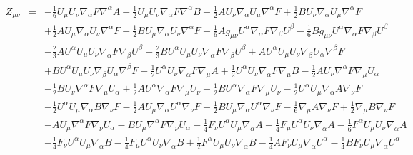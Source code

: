 \documentclass[10pt,letterpaper]{article}
\numberwithin{equation}{section}
\begin{document}
\begin{eqnarray}
Z_{\mu\nu}&=& - \tfrac{1}{6} U_{\mu } U_{\nu } \nabla_{\alpha }F \nabla^{\alpha }A + \tfrac{1}{2} U_{\mu } U_{\nu } \nabla_{\alpha }F \nabla^{\alpha }B + \tfrac{1}{2} A U_{\nu } \nabla_{\alpha }U_{\mu } \nabla^{\alpha }F + \tfrac{1}{2} B U_{\nu } \nabla_{\alpha }U_{\mu } \nabla^{\alpha }F \nonumber \\ 
&& + \tfrac{1}{2} A U_{\mu } \nabla_{\alpha }U_{\nu } \nabla^{\alpha }F + \tfrac{1}{2} B U_{\mu } \nabla_{\alpha }U_{\nu } \nabla^{\alpha }F -  \tfrac{1}{6} A g_{\mu \nu } U^{\alpha } \nabla_{\alpha }F \nabla_{\beta }U^{\beta } -  \tfrac{1}{6} B g_{\mu \nu } U^{\alpha } \nabla_{\alpha }F \nabla_{\beta }U^{\beta } \nonumber \\ 
&& -  \tfrac{2}{3} A U^{\alpha } U_{\mu } U_{\nu } \nabla_{\alpha }F \nabla_{\beta }U^{\beta } -  \tfrac{2}{3} B U^{\alpha } U_{\mu } U_{\nu } \nabla_{\alpha }F \nabla_{\beta }U^{\beta } + A U^{\alpha } U_{\mu } U_{\nu } \nabla_{\beta }U_{\alpha } \nabla^{\beta }F \nonumber \\ 
&& + B U^{\alpha } U_{\mu } U_{\nu } \nabla_{\beta }U_{\alpha } \nabla^{\beta }F + \tfrac{1}{2} U^{\alpha } U_{\nu } \nabla_{\alpha }F \nabla_{\mu }A + \tfrac{1}{2} U^{\alpha } U_{\nu } \nabla_{\alpha }F \nabla_{\mu }B -  \tfrac{1}{2} A U_{\nu } \nabla^{\alpha }F \nabla_{\mu }U_{\alpha } \nonumber \\ 
&& -  \tfrac{1}{2} B U_{\nu } \nabla^{\alpha }F \nabla_{\mu }U_{\alpha } + \tfrac{1}{2} A U^{\alpha } \nabla_{\alpha }F \nabla_{\mu }U_{\nu } + \tfrac{1}{2} B U^{\alpha } \nabla_{\alpha }F \nabla_{\mu }U_{\nu } -  \tfrac{1}{2} U^{\alpha } U_{\mu } \nabla_{\alpha }A \nabla_{\nu }F \nonumber \\ 
&& -  \tfrac{1}{2} U^{\alpha } U_{\mu } \nabla_{\alpha }B \nabla_{\nu }F -  \tfrac{1}{2} A U_{\mu } \nabla_{\alpha }U^{\alpha } \nabla_{\nu }F -  \tfrac{1}{2} B U_{\mu } \nabla_{\alpha }U^{\alpha } \nabla_{\nu }F -  \tfrac{1}{6} \nabla_{\mu }A \nabla_{\nu }F + \tfrac{1}{2} \nabla_{\mu }B \nabla_{\nu }F \nonumber \\ 
&& -  A U_{\mu } \nabla^{\alpha }F \nabla_{\nu }U_{\alpha } -  B U_{\mu } \nabla^{\alpha }F \nabla_{\nu }U_{\alpha }- \tfrac{1}{4} F_{\nu } U^{\alpha } U_{\mu } \nabla_{\alpha }A -  \tfrac{1}{4} F_{\mu } U^{\alpha } U_{\nu } \nabla_{\alpha }A -  \tfrac{1}{6} F^{\alpha } U_{\mu } U_{\nu } \nabla_{\alpha }A \nonumber \\ 
&& -  \tfrac{1}{4} F_{\nu } U^{\alpha } U_{\mu } \nabla_{\alpha }B -  \tfrac{1}{4} F_{\mu } U^{\alpha } U_{\nu } \nabla_{\alpha }B + \tfrac{1}{2} F^{\alpha } U_{\mu } U_{\nu } \nabla_{\alpha }B -  \tfrac{1}{4} A F_{\nu } U_{\mu } \nabla_{\alpha }U^{\alpha } -  \tfrac{1}{4} B F_{\nu } U_{\mu } \nabla_{\alpha }U^{\alpha } \nonumber \\ 

\end{eqnarray}
\end{document}
